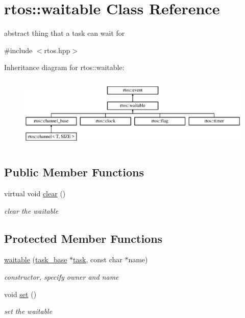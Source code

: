 \hypertarget{classrtos_1_1waitable}{}\section{rtos\+:\+:waitable Class Reference}
\label{classrtos_1_1waitable}


abstract thing that a task can wait for  




{\ttfamily \#include $<$rtos.\+hpp$>$}

Inheritance diagram for rtos\+:\+:waitable\+:\begin{figure}[H]
\begin{center}
\leavevmode
\includegraphics[height=3.500000cm]{classrtos_1_1waitable}
\end{center}
\end{figure}
\subsection*{Public Member Functions}
\begin{DoxyCompactItemize}
\item 
virtual void \hyperlink{classrtos_1_1waitable_a4571df4fc41d342cce418d591e0a9bdd}{clear} ()
\begin{DoxyCompactList}\small\item\em clear the waitable \end{DoxyCompactList}\end{DoxyCompactItemize}
\subsection*{Protected Member Functions}
\begin{DoxyCompactItemize}
\item 
\hyperlink{classrtos_1_1waitable_aec600b639ba55717731d3c6cfe6ff8e6}{waitable} (\hyperlink{classrtos_1_1task__base}{task\+\_\+base} $\ast$\hyperlink{classrtos_1_1task}{task}, const char $\ast$name)
\begin{DoxyCompactList}\small\item\em constructor, specify owner and name \end{DoxyCompactList}\item 
void \hyperlink{classrtos_1_1waitable_a6ef912480d9662171607aac42f7e4bbb}{set} ()\hypertarget{classrtos_1_1waitable_a6ef912480d9662171607aac42f7e4bbb}{}\label{classrtos_1_1waitable_a6ef912480d9662171607aac42f7e4bbb}

\begin{DoxyCompactList}\small\item\em set the waitable \end{DoxyCompactList}\end{DoxyCompactItemize}
